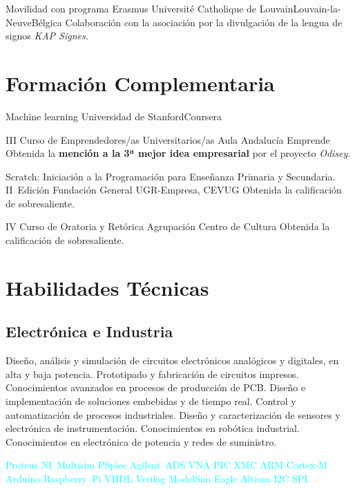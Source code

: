\documentclass[11pt,a4paper,sans,spanish]{moderncv}
\begin{document}
{Movilidad con programa Erasmus}
{Université Catholique de Louvain}{Louvain-la-Neuve}{Bélgica}
{Colaboración con la asociación por la divulgación de la lengua de signos \emph{KAP Signes.}}


\section{Formación Complementaria}

{Machine learning}
{Universidad de Stanford}{Coursera}{}
{}

{III Curso de Emprendedores/as Universitarios/as}
{Aula Andalucía Emprende}{}{}
{Obtenida la \textbf{mención a la 3ª mejor idea empresarial} por el proyecto \emph{Odisey}. }

{Scratch: Iniciación a la Programación para Enseñanza Primaria y Secundaria. II~Edición}
{Fundación General UGR-Empresa, CEVUG}{}{}
{Obtenida la calificación de sobresaliente.}

{IV Curso de Oratoria y Retórica}
{Agrupación Centro de Cultura}{}{}
{Obtenida la calificación de sobresaliente.}


\section{Habilidades Técnicas}

\subsection{Electrónica e Industria}
{Diseño, análisis y simulación de circuitos electrónicos analógicos y digitales, en alta y baja potencia.}\quad{}
Prototipado y fabricación de circuitos impresos.\quad{}
{Conocimientos avanzados en procesos de producción de PCB.}\quad{}
Diseño e implementación de soluciones embebidas y de tiempo real.\quad
{Control y automatización de procesos industriales.}\quad
Diseño y caracterización de sensores y electrónica de instrumentación.\quad
{Conocimientos en robótica industrial.}\quad
{Conocimientos en electrónica de potencia y redes de suministro.}

\begin{center}
\textcolor{cyan}{
Proteus \quad{} NI~Multisim \quad{} PSpice \quad{}
Agilent~ADS \quad{} VNA \quad{}
PIC \quad{} XMC \quad{} ARM Cortex-M \quad{} Arduino \quad{} Raspberry~Pi \quad{}
VHDL \quad{} Verilog \quad{} ModelSim \quad{}
Eagle \quad{} Altium \quad{} I2C \quad{} SPI
}
\end{center}
\end{document}
